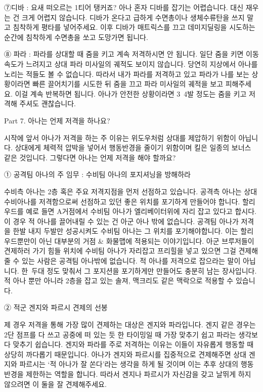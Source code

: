  

⑦디바 : 요새 떠오르는 1티어 탱커죠? 아나 혼자 디바를 잡기는 어렵습니다. 대신 재우는 건 크게 어렵지 않습니다. 디바가 온다고 급하게 수면총이나 생체수류탄을 쓰지 말고 침착하게 평타를 넣어주세요. 이후 디바가 매트릭스를 끄고 데미지딜링을 시도하는 순간에 침착하게 수면총을 쏘고 도망가면 됩니다.

 

⑧ 파라 : 파라를 상대할 때 줌을 키고 계속 저격하시면 안 됩니다. 일단 줌을 키면 이동속도가 느려지고 상대 파라 미사일의 궤적도 보이지 않습니다. 당연히 지상에서 아나를 노리는 적들도 볼 수 없습니다. 따라서 내가 파라를 저격하고 있고 파라가 나를 보는 상황이라면 빠른 끌어치기를 시도한 뒤 줌을 끄고 파라 미사일의 궤적을 보고 피해주세요. 이걸 계속 반복하면 됩니다. 아나가 안전한 상황이라면 3~4발 정도는 줌을 키고 저격해 주셔도 괜찮습니다.

 

 

 

Part 7. 아나는 언제 저격을 하나요?

 

시작에 앞서 아나가 저격을 하는 주 이유는 위도우처럼 상대를 제압하기 위함이 아닙니다. 상대에게 체력적 압박을 넣어서 행동반경을 줄이기 위함이며 킬은 일종의 보너스 같은 것입니다. 그렇다면 아나는 언제 저격을 해야 할까요?

 

① 공격팀 아나의 주 임무 : 수비팀 아나의 포지셔닝을 방해하라

수비측 아나는 2층 혹은 주요 저격지점을 먼저 선점하고 있습니다. 공격측 아나는 상대 수비아나를 저격함으로써 선점하고 있던 좋은 위치를 포기하게 만들어야 합니다. 할리우드를 예로 들면 A거점에서 수비팀 아나가 엘리베이터위에 자리 잡고 있다고 합시다. 이 경우 적 아나를 끌어내릴 수 있는 건 아군 아나 밖에 없습니다. 공격팀 아나가 저격을 한발 내지 두발만 성공시켜도 수비팀 아나는 그 위치를 포기해야합니다. 이는 할리우드뿐만이 아닌 대부분의 거점 & 화물맵에 적용되는 이야기입니다. 아군 브루저들이 견제하러 가기 힘들 위치에 수비팀 아나가 자리잡고 프리힐을 넣고 있으면 그걸 견제해 줄 수 있는 사람은 공격팀 아나밖에 없습니다. 적 아나를 저격으로 잡으라는 말이 아닙니다. 한~두대 정도 맞춰서 그 포지션을 포기하게만 만들어도 충분히 남는 장사입니다. 적 아나 뿐만 아니라 2층을 잡고 있는 솔져, 맥크리도 같은 맥락으로 적용할 수 있습니다.

 

② 적군 겐지와 파르시 견제의 선봉

제 경우 저격을 통해 가장 많이 견제하는 대상은 겐지와 파라입니다. 겐지 같은 경우는 2단 점프를 다 쓰고 공중에 떠 있는 듯 한 타이밍일 때 가장 맞추기 쉽고 파라는 생각보다 맞추기 쉽습니다. 겐지와 파라를 주로 저격하는 이유는 이들이 자유롭게 행동할 때 상당히 까다롭기 때문입니다. 아나가 겐지와 파르시를 집중적으로 견제해주면 상대 겐지와 파르시는 ‘적 아나가 잘 쏜다’라는 생각을 하게 될 것이며 이는 추후 상대의 행동반경을 제한하는 역할을 합니다. 따라서 겐지나 파르시가 자신감을 갖고 날뛰게 하지 않으려면 이 둘을 잘 견제해주세요.



